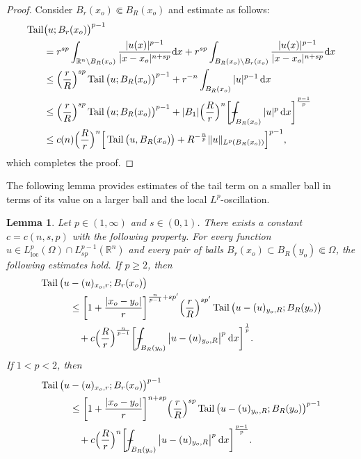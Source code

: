 \documentclass[10pt,letterpaper]{amsart}
\newtheorem{lemma}[theorem]{Lemma}
\theoremstyle{definition}
\numberwithin{theorem}{section}
\numberwithin{equation}{section}
\newcommand{\R}{\ensuremath{\mathbb{R}}}
\newcommand{\1}{\ensuremath{\mathds{1}}}
\newcommand{\dx}{\mathrm{d}x}
\def\Xint#1{\mathchoice
    {\XXint\displaystyle\textstyle{#1}}%
    {\XXint\textstyle\scriptstyle{#1}}%
    {\XXint\scriptstyle\scriptscriptstyle{#1}}%
    {\XXint\scriptscriptstyle\scriptscriptstyle{#1}}%
    \!\int}
\def\XXint#1#2#3{\setbox0=\hbox{$#1{#2#3}{\int}$}
    \vcenter{\hbox{$#2#3$}}\kern-0.5\wd0}
\def\bint{\Xint-}
\renewcommand{\d}{\:\! \mathrm{d}}
\DeclareMathOperator{\Tail}{Tail}
\numberwithin{equation}{section}
\begin{document}
\begin{proof}
Consider 
$B_r(x_o)\Subset B_R(x_o)$ and estimate as follows:
\begin{align*}
    \Tail &\big(u; B_r(x_o)\big)^{p-1}\\
    &=r^{sp}\int_{\R^n\setminus B_R(x_o)}\frac{|u(x)|^{p-1}}{|x-x_o|^{n+sp}}\dx+r^{sp}\int_{B_R(x_o)\setminus B_r(x_o)}\frac{|u(x)|^{p-1}}{|x-x_o|^{n+sp}}\dx\\
    &\le
    \Big(\frac{r}{R}\Big)^{sp} \Tail \big(u; B_R(x_o)
    \big)^{p-1} +
    r^{-n} \int_{B_R(x_o)} |u|^{p-1} \,\dx \\
    &\le
    \Big(\frac{r}{R}\Big)^{sp} \Tail \big(u;  B_R(x_o)
    \big)^{p-1} +
    |B_1| \Big(\frac{R}{r}\Big)^n 
    \bigg[\bint_{B_R(x_o)}
    |u|^p\,\dx
    \bigg]^{\frac{p-1}p}\\
    &\le
    c(n)\Big(\frac{R}{r}\Big)^n
    \Big[
    \Tail \big(u, B_R(x_o)\big)
    + 
    R^{-\frac{n}{p}}\| u\|_{L^p(B_R(x_o))}
    \Big]^{p-1},
\end{align*}
which completes the proof.
\end{proof}



The following lemma provides estimates of the tail term on a smaller ball in terms of its value on a larger ball and the local $L^p$-oscillation.

\begin{lemma}\label{lem:tail}
Let \(p\in(1,\infty)\) and \(s\in(0,1)\).
There exists a constant \(c=c(n,s,p)\) with the following property.
For every function
\(u\in L^p_{\mathrm{loc}}(\Omega)\cap L^{p-1}_{sp}(\mathbb{R}^n)\)
and every pair of balls
\(B_r(x_o)\subset B_R(y_o)\Subset\Omega\),
the following estimates hold.
If \(p\ge 2\), then
\begin{align*}
    \Tail \big(u&-(u)_{x_o,r}; B_r(x_o)\big) \\
    &\le 
    \bigg[1 + \frac{|x_o-y_o|}{r}\bigg]^{\frac{n}{p-1}+sp'} 
    \Big(\frac{r}{R}\Big)^{sp'} \Tail \big(u-(u)_{y_o,R}; B_R(y_o)\big) \\
    &\phantom{\le\,} + 
    c\Big(\frac{R}{r}\Big)^{\frac{n}{p-1}}
    \bigg[ \bint_{B_{R}(y_o)} \big|u-(u)_{y_o,R}\big|^{p} \, \d x \bigg]^\frac{1}{p}.
\end{align*}
If \(1<p<2\), then
\begin{align*}
    \Tail \big(u&-(u)_{x_o,r}; B_r(x_o)\big)^{p-1} \\
    &\le
    \bigg[1 + \frac{|x_o-y_o|}{r}\bigg]^{n+sp} 
    \Big(\frac{r}{R}\Big)^{sp} \Tail \big(u-(u)_{y_o,R}; B_R(y_o)\big)^{p-1} \\
    &\phantom{\le\,} + 
    c\Big(\frac{R}{r}\Big)^{n}
    \bigg[ \bint_{B_{R}(y_o)} \big|u-(u)_{y_o,R}\big|^{p} \, \d x \bigg]^\frac{p-1}{p}.
\end{align*}
\end{lemma}
\end{document}
